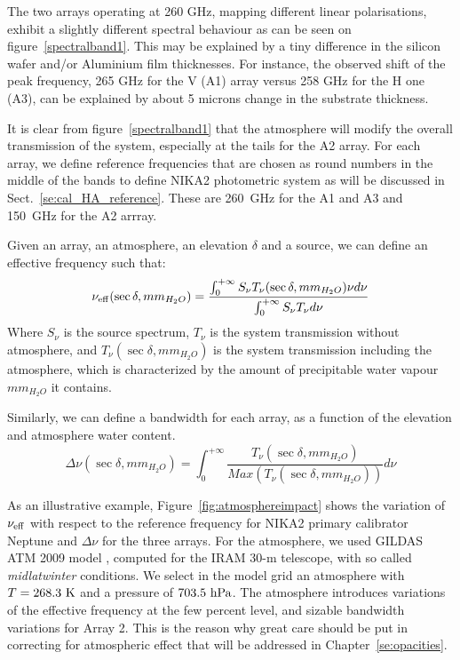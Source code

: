 The two arrays operating at 260 GHz, mapping different linear polarisations,
exhibit a slightly different spectral behaviour as can be
seen on figure~\ref{spectralband1}. This may be explained by a tiny
difference in the silicon wafer and/or Aluminium film thicknesses. For
instance, the observed shift of the peak frequency, 265 GHz for the V
(A1) array versus 258 GHz for the H one (A3), can be explained by
about 5 microns change in the substrate thickness. 

It is clear from figure~\ref{spectralband1} that the atmosphere will
modify the overall transmission of the system, especially at the tails
for the A2 array.
For each array, we define reference frequencies that are chosen
as round numbers in the middle of the bands to define NIKA2
photometric system as will be discussed in
Sect.~\ref{se:cal_HA_reference}. These are 260~GHz for the A1 and A3 and
150~GHz for the A2 arrray.

Given an array, an atmosphere, an elevation $\delta$ and a source, we can
define an effective frequency such that:
\begin{equation}
\nu_{\rm{eff}}( \sec \delta, mm_{H_{2}O}) = \frac{ \int_{0}^{+\infty} S_{\nu}
  T_{\nu}(\sec \delta, mm_{H_{2}O}) \nu d\nu } { \int_{0}^{+\infty} S_{\nu} T_{\nu} d\nu}
\label{eq:nueff0}
\end{equation}
Where $S_{\nu}$ is the source spectrum, $T_{\nu}$ is the system
transmission without atmosphere, and $T_{\nu}(\sec \delta,
mm_{H_{2}O})$ is the system transmission including the atmosphere,
which is characterized by the amount of precipitable water vapour
$mm_{H_{2}O}$ it contains. 


Similarly, we can define a bandwidth for each array, as a function of
the elevation and atmosphere water content.
\begin{equation}
\Delta\nu ( \sec \delta, mm_{H_{2}O}) = \int_{0}^{+\infty} \frac{T_{\nu}( \sec \delta, mm_{H_{2}O})}{Max(T_{\nu}( \sec \delta, mm_{H_{2}O}))}d\nu
\end{equation}

As an illustrative example, Figure~\ref{fig:atmosphereimpact} shows the variation of $\nu_{\rm{eff}}$
with respect to the reference frequency for NIKA2 primary calibrator Neptune and $\Delta\nu$ for the three
arrays. For the atmosphere, we used GILDAS ATM 2009 model \cite{ATM}, computed for
the IRAM 30-m telescope, with so called {\it midlatwinter} conditions. We select in the model
grid an atmosphere with $T=268.3 \ {\rm K}$ and a pressure of $703.5 \
{\rm hPa}$. The atmosphere introduces variations of the effective
frequency at the few percent level, and sizable bandwidth variations for
Array 2. This is the reason why great care should be put in
correcting for atmospheric effect that will be addressed in Chapter~\ref{se:opacities}.



